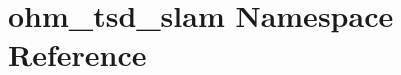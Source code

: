 \hypertarget{namespaceohm__tsd__slam}{\section{ohm\-\_\-tsd\-\_\-slam Namespace Reference}
\label{namespaceohm__tsd__slam}
}
